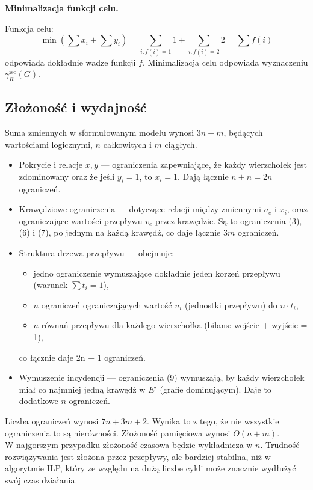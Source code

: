 \textbf{Minimalizacja funkcji celu.}

Funkcja celu:
\[
\min \left( \sum x_i + \sum y_i \right) = \sum_{i : f(i) = 1} 1 + \sum_{i : f(i) = 2} 2 = \sum f(i)
\]
odpowiada dokładnie wadze funkcji \( f \). Minimalizacja celu odpowiada wyznaczeniu \( \gamma^{\text{wc}}_R(G) \).

\subsection{Złożoność i wydajność}

Suma zmiennych w sformułowanym modelu wynosi $3n + m$, będących wartościami logicznymi, $n$ całkowitych i $m$ ciągłych.
\begin{itemize}
    \item Pokrycie i relacje \( x,y \) — ograniczenia zapewniające, że każdy wierzchołek jest zdominowany oraz że jeśli \( y_i = 1 \), to \( x_i = 1 \). Dają łącznie \( n + n = 2n \) ograniczeń.
    
    \item Krawędziowe ograniczenia — dotyczące relacji między zmiennymi \( a_e \) i \( x_i \), oraz ograniczające wartości przepływu \( v_e \) przez krawędzie. Są to ograniczenia (3), (6) i (7), po jednym na każdą krawędź, co daje łącznie $3m$ ograniczeń.
    
    \item Struktura drzewa przepływu — obejmuje:
    \begin{itemize}
        \item jedno ograniczenie wymuszające dokładnie jeden korzeń przepływu (warunek \( \sum t_i = 1 \)),
        \item \( n \) ograniczeń ograniczających wartość \( u_i \) (jednostki przepływu) do \( n \cdot t_i \),
        \item \( n \) równań przepływu dla każdego wierzchołka (bilans: wejście + wyjście = 1),
    \end{itemize}
    co łącznie daje 2n + 1 ograniczeń.
    
    \item Wymuszenie incydencji — ograniczenia (9) wymuszają, by każdy wierzchołek miał co najmniej jedną krawędź w \( E' \) (grafie dominującym). Daje to dodatkowe $n$ ograniczeń.
\end{itemize}

\noindent
Liczba ograniczeń wynosi $7n+3m+2$. Wynika to z tego, że nie wszystkie ograniczenia to są nierówności.
Złożoność pamięciowa wynosi $O(n+m)$.\\
W najgorszym przypadku złożoność czasowa będzie wykładnicza w $n$. Trudność rozwiązywania jest złożona przez przepływy, ale bardziej stabilna, niż w algorytmie ILP, który ze względu na dużą liczbe cykli może znacznie wydłużyć swój czas działania.

